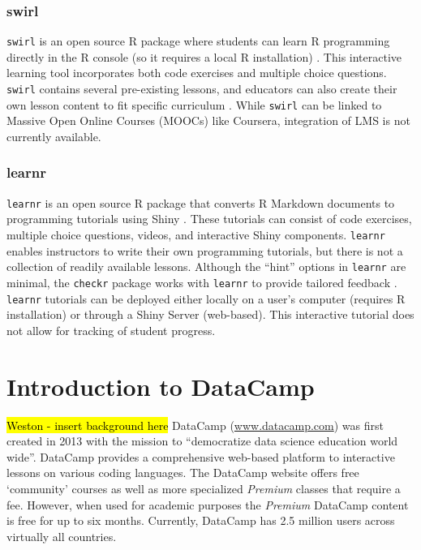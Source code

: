 \documentclass{tise_style_doi}
\begin{document}
\subsubsection{swirl}

\texttt{swirl} is an open source R package where students can learn R programming
directly in the R console (so it requires a local R installation) \citep{Kross}.
This interactive learning tool incorporates both code exercises and multiple choice
questions. \texttt{swirl} contains several pre-existing lessons, and
educators can also create their own lesson content to fit
specific curriculum \citep{Carchedi2014}.  While \texttt{swirl} can be linked to Massive
Open Online Courses (MOOCs) like Coursera, integration of LMS
is not currently available.

\subsubsection{learnr}

\texttt{learnr} is an open source R package that converts R Markdown documents
to programming tutorials using Shiny \citep{GarrettGrolemund2017}.  These
tutorials can consist of code exercises, multiple choice questions, videos,
and interactive Shiny components.  \texttt{learnr} enables instructors to
write their own programming tutorials, but there is not a collection of readily available
lessons.  Although the ``hint'' options in \texttt{learnr}
are minimal, the \texttt{checkr} package works with \texttt{learnr} to provide
tailored feedback \citep{DanielKaplan2018}.  \texttt{learnr} tutorials can be deployed either
locally on a user's computer (requires R installation) or through a Shiny Server (web-based).
This interactive tutorial does not allow for tracking of student progress.



\section{Introduction to DataCamp}

\hl{Weston - insert background here}
DataCamp (\url{www.datacamp.com}) was first created in 2013 with the mission to 
``democratize data science education world wide''.
DataCamp provides a comprehensive web-based platform to interactive lessons on various coding
languages. The DataCamp website offers free `community' courses
as well as more specialized \textit{Premium} classes that require a fee. However, when used
for academic purposes the \textit{Premium} DataCamp content is free for up to six months.
Currently, DataCamp has 2.5 million users across virtually all countries.
\end{document}

